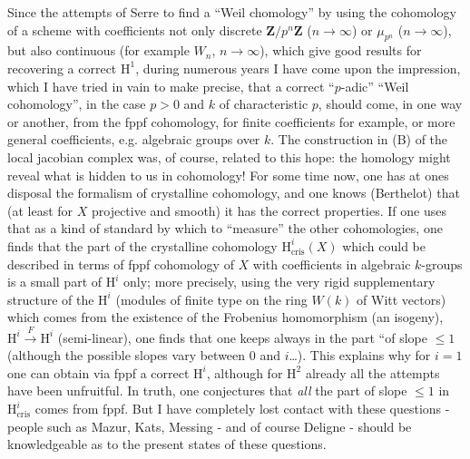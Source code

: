     Since the attempts of Serre to find a ``Weil chomology'' by using the cohomology of a scheme with coefficients not only discrete $\mathbf{Z}/p^n\mathbf{Z}$ ($n \to \infty$) or $\mu_{p^n}$ ($n \to \infty$), but also continuous (for example $W_n$, $n \to \infty$), which give good results for recovering a correct $\mathrm{H}^1$, during numerous years I have come upon the impression, which I have tried in vain to make precise, that a correct ``$p$-adic'' ``Weil cohomology'', in the case $p > 0$ and $k$ of characteristic $p$, should come, in one way or another, from the fppf cohomology, for finite coefficients for example, or more general coefficients, e.g. algebraic groups over $k$. The construction in (B) of the local jacobian complex was, of course, related to this hope: the homology might reveal what is hidden to us in cohomology! For some time now, one has at ones disposal the formalism of crystalline cohomology, and one knows (Berthelot) that (at least for $X$ projective and smooth) it has the correct properties. If one uses that as a kind of standard by which to ``measure'' the other cohomologies, one finds that the part of the crystalline cohomology $\mathrm{H}^i_{\text{cris}}(X)$ which could be described in terms of fppf cohomology of $X$ with coefficients in algebraic $k$-groups is a small part of $\mathrm{H}^i$ only; more precisely, using the very rigid supplementary structure of the $\mathrm{H}^i$ (modules of finite type on the ring $W(k)$ of Witt vectors) which comes from the existence of the Frobenius homomorphism (an isogeny), $\mathrm{H}^i \xrightarrow{F} \mathrm{H}^i$ (semi-linear), one finds that one keeps always in the part ``of slope $\leq 1$ (although the possible slopes vary between 0 and $i$\dots). This explains why for $i = 1$ one can obtain via fppf a correct $\mathrm{H}^i$, although for $\mathrm{H}^2$ already all the attempts have been unfruitful.
In truth, one conjectures that \emph{all} the part of slope $\leq 1$ in $\mathrm{H}^i_{\text{cris}}$ comes from fppf. But I have completely lost contact with these questions - people such as Mazur, Kats, Messing - and of course Deligne - should be knowledgeable as to the present states of these questions.

\starsbreak

